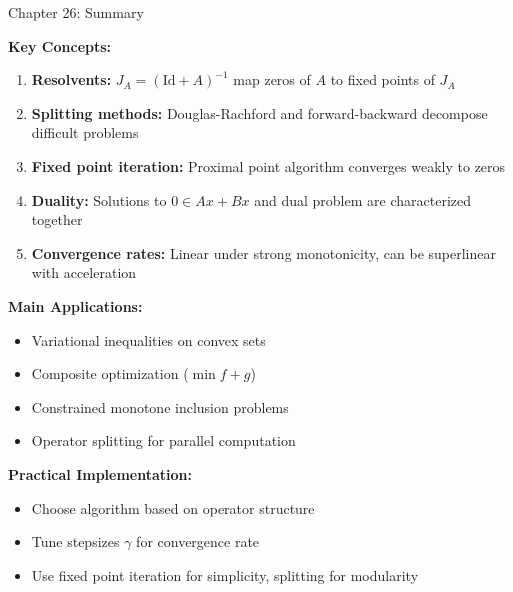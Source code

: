 \documentclass[aspectratio=169,10pt]{beamer}
\begin{document}

\begin{frame}{Chapter 26: Summary}

\textbf{Key Concepts:}
\begin{enumerate}
  \item \textbf{Resolvents:} $J_A = (\text{Id} + A)^{-1}$ map zeros of $A$ to fixed points of $J_A$

  \item \textbf{Splitting methods:} Douglas-Rachford and forward-backward decompose difficult problems

  \item \textbf{Fixed point iteration:} Proximal point algorithm converges weakly to zeros

  \item \textbf{Duality:} Solutions to $0 \in Ax + Bx$ and dual problem are characterized together

  \item \textbf{Convergence rates:} Linear under strong monotonicity, can be superlinear with acceleration
\end{enumerate}

\vspace{0.4cm}
\textbf{Main Applications:}
\begin{itemize}
  \item Variational inequalities on convex sets
  \item Composite optimization ($\min f + g$)
  \item Constrained monotone inclusion problems
  \item Operator splitting for parallel computation
\end{itemize}

\vspace{0.4cm}
\textbf{Practical Implementation:}
\begin{itemize}
  \item Choose algorithm based on operator structure
  \item Tune stepsizes $\gamma$ for convergence rate
  \item Use fixed point iteration for simplicity, splitting for modularity
\end{itemize}

\end{frame}
\end{document}
